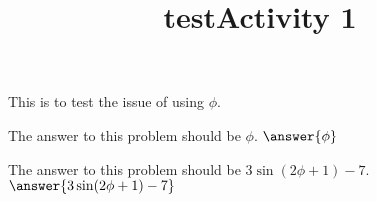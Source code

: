 \documentclass{ximera}
\title{testActivity 1}
\begin{document}
This is to test the issue of using $\phi$.

\begin{problem}
    The answer to this problem should be $\phi$. $\answer{\phi}$
\end{problem}

\begin{problem}
    The answer to this problem should be $3\sin(2\phi + 1) - 7$. $\answer{3\sin(2\phi + 1)-7}$
\end{problem}
\end{document}
